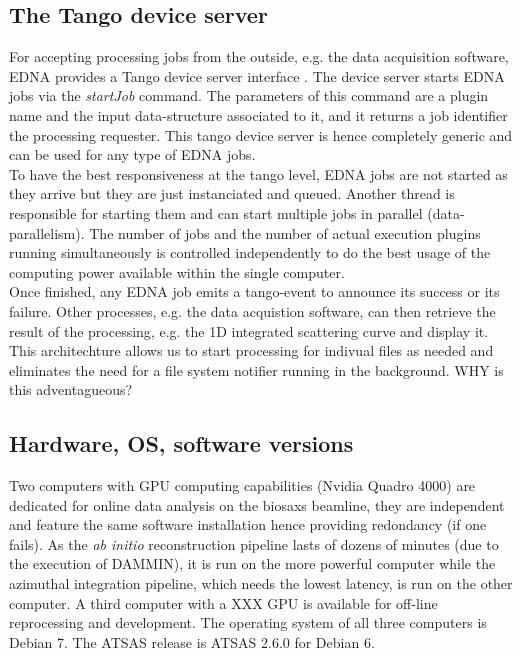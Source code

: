 \documentclass[preprint,pdf]{iucr}              %
\begin{document}
\subsection{The Tango device server} 
For accepting processing jobs from the outside, e.g. the data acquisition software, EDNA provides a Tango device server interface \cite{tango,pytango}. The device server starts  EDNA
jobs via the \textit{startJob} command. The parameters of this command are a plugin name and the input data-structure associated to it, and  it returns a job
identifier the processing requester. This tango device server is hence completely generic and can be used for any type of EDNA jobs.\\

To have the best responsiveness at the tango level, EDNA jobs are not started as they arrive but they are just instanciated and queued.  
Another thread is responsible for starting them and can start multiple jobs in parallel
(data-parallelism). The number of jobs and the number of actual execution
plugins running simultaneously is controlled independently to do the best usage
of the computing power available within the  single computer.\\

Once finished, any EDNA job emits a tango-event to announce its success or its failure. Other processes, e.g. the data acquistion software, can then retrieve the result of the processing, e.g. the 1D integrated scattering curve and display it. \\
This architechture allows us to start processing for indivual files as needed and eliminates the need for a file system notifier running in the background. WHY is this adventagueous?

\subsection{Hardware, OS, software versions}
Two computers with GPU computing capabilities (Nvidia Quadro 4000) are dedicated
for online data analysis on the biosaxs beamline, they are independent and
feature the same software installation hence providing redondancy (if one fails).
As the \textit{ab initio} reconstruction pipeline lasts of dozens of minutes
(due to the execution of DAMMIN), it is run on the more powerful computer while 
the azimuthal integration pipeline, which needs the lowest latency, is run on
the other computer. A third computer with a XXX GPU is available for off-line reprocessing and development. The operating system of all three computers is Debian 7. The ATSAS release is ATSAS 2.6.0 for Debian 6.
\end{document}
